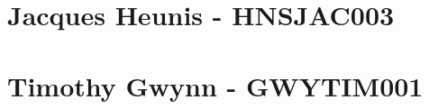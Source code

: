 \documentclass[11pt,a4paper]{article}
\begin{document}
\section{Jacques Heunis - HNSJAC003}
\section{Timothy Gwynn - GWYTIM001}
\end{document}
